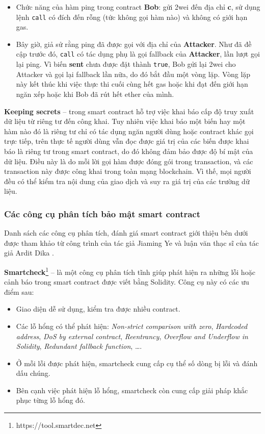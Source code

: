 \documentclass[../main-report.tex]{subfiles}
\begin{document}
\begin{itemize}
\item Chức năng của hàm ping trong contract \textbf{Bob}: gửi 2wei đến địa chỉ \textbf{c}, sử dụng lệnh \texttt{call} có đích đến rỗng (tức không gọi hàm nào) và không có giới hạn gas.
\item Bây giờ, giả sử rằng ping đã được gọi với địa chỉ của \textbf{Attacker}. Như đã đề cập trước đó, \texttt{call} có tác dụng phụ là gọi fallback của \textbf{Attacker}, lần lượt gọi lại ping. Vì biến \textbf{sent} chưa được đặt thành \texttt{true}, Bob gửi lại 2wei cho Attacker và gọi lại fallback lần nữa, do đó bắt đầu một vòng lặp. Vòng lặp này kết thúc khi việc thực thi cuối cùng hết gas hoặc khi đạt đến giới hạn ngăn xếp hoặc khi Bob đã rút hết ether của mình.
\end{itemize}

\textbf{Keeping secrets} -- trong smart contract hỗ trợ việc khai báo cấp độ truy xuất dữ liệu từ riêng tư đến công khai. Tuy nhiên việc khai báo một biến hay một hàm nào đó là riêng tư chỉ có tác dụng ngăn người dùng hoặc contract khác gọi trực tiếp, trên thực tế người dùng vẫn đọc được giá trị của các biến được khai báo là riêng tư trong smart contract, do đó không đảm bảo được độ bí mật của dữ liệu. Điều này là do mỗi lời gọi hàm được đóng gói trong transaction, và các transaction này được công khai trong toàn mạng blockchain. Vì thế, mọi người đều có thể kiểm tra nội dung của giao dịch và suy ra giá trị của các trường dữ liệu.

\subsubsection{Các công cụ phân tích bảo mật smart contract}
\label{sec:smartcontract-vuln}
Danh sách các công cụ phân tích, đánh giá smart contract giới thiệu bên dưới được tham khảo từ công trình của tác giả Jiaming Ye \cite{8728953} và luận văn thạc sĩ của tác giả Ardit Dika \cite{dika2017ethereum}.

\textbf{Smartcheck}\footnote{https://tool.smartdec.net} -- là một công cụ phân tích tĩnh giúp phát hiện ra những lỗi hoặc cảnh báo trong smart contract được viết bằng Solidity. Công cụ này có các ưu điểm sau:

\begin{itemize}
\item Giao diện dễ sử dụng, kiểm tra được nhiều contract.
\item Các lỗ hổng có thể phát hiện: \textit{Non-strict comparison with zero}, \textit{Hardcoded address},  \textit{DoS by external contract}, \textit{Reentrancy}, \textit{Overflow and Underflow in Solidity}, \textit{Redundant fallback function}, \ldots.
\item Ở mỗi lỗi được phát hiện, smartcheck cung cấp cụ thể số dòng bị lỗi và đánh dấu chúng.
\item Bên cạnh việc phát hiện lỗ hổng, smartcheck còn cung cấp giải pháp khắc phục từng lỗ hổng đó.
\end{itemize}
\end{document}
